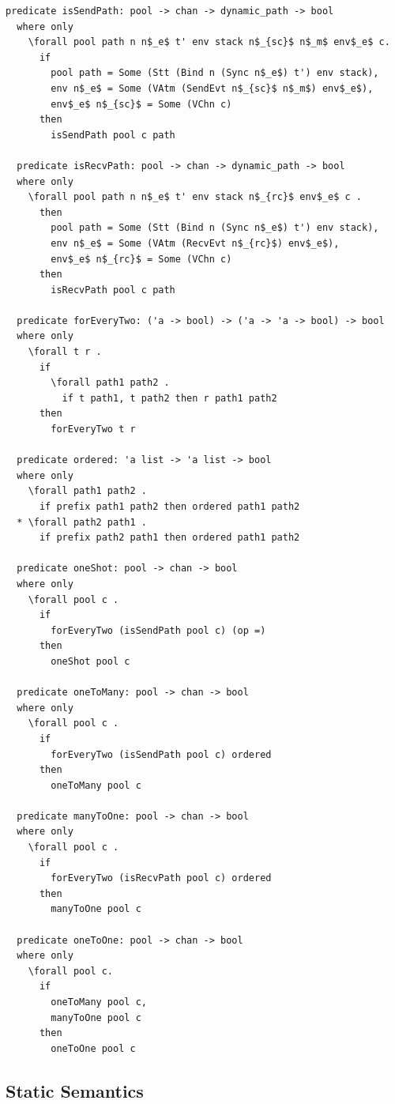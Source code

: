 \documentclass[letterpaper, 11pt]{extarticle}
\begin{document}
\begin{lstlisting}[language=logic, mathescape]
  predicate isSendPath: pool -> chan -> dynamic_path -> bool
  where only
    \forall pool path n n$_e$ t' env stack n$_{sc}$ n$_m$ env$_e$ c.
      if
        pool path = Some (Stt (Bind n (Sync n$_e$) t') env stack),
        env n$_e$ = Some (VAtm (SendEvt n$_{sc}$ n$_m$) env$_e$), 
        env$_e$ n$_{sc}$ = Some (VChn c)
      then
        isSendPath pool c path

  predicate isRecvPath: pool -> chan -> dynamic_path -> bool
  where only
    \forall pool path n n$_e$ t' env stack n$_{rc}$ env$_e$ c .
      then
        pool path = Some (Stt (Bind n (Sync n$_e$) t') env stack),
        env n$_e$ = Some (VAtm (RecvEvt n$_{rc}$) env$_e$),
        env$_e$ n$_{rc}$ = Some (VChn c)
      then
        isRecvPath pool c path

  predicate forEveryTwo: ('a -> bool) -> ('a -> 'a -> bool) -> bool
  where only
    \forall t r .
      if
        \forall path1 path2 .
          if t path1, t path2 then r path1 path2
      then
        forEveryTwo t r

  predicate ordered: 'a list -> 'a list -> bool
  where only
    \forall path1 path2 .
      if prefix path1 path2 then ordered path1 path2
  * \forall path2 path1 .
      if prefix path2 path1 then ordered path1 path2

  predicate oneShot: pool -> chan -> bool
  where only
    \forall pool c .
      if
        forEveryTwo (isSendPath pool c) (op =)
      then
        oneShot pool c

  predicate oneToMany: pool -> chan -> bool
  where only
    \forall pool c .
      if
        forEveryTwo (isSendPath pool c) ordered
      then
        oneToMany pool c

  predicate manyToOne: pool -> chan -> bool
  where only
    \forall pool c .
      if
        forEveryTwo (isRecvPath pool c) ordered
      then
        manyToOne pool c

  predicate oneToOne: pool -> chan -> bool
  where only
    \forall pool c.
      if
        oneToMany pool c,
        manyToOne pool c
      then
        oneToOne pool c
\end{lstlisting}


\subsection{Static Semantics}
\end{document}
